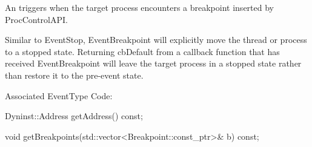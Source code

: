 
An  triggers when the target process encounters
a breakpoint
inserted by ProcControlAPI.

Similar to EventStop, EventBreakpoint will explicitly move the thread or process
to a stopped state. Returning cbDefault from a callback function that has
received EventBreakpoint will leave the target process in a stopped state
rather than restore it to the pre-event state.

Associated EventType Code: 

\begin{apient}
  Dyninst::Address getAddress() const;
\end{apient}


\begin{apient}
  void getBreakpoints(std::vector<Breakpoint::const_ptr>& b) const;
\end{apient}

